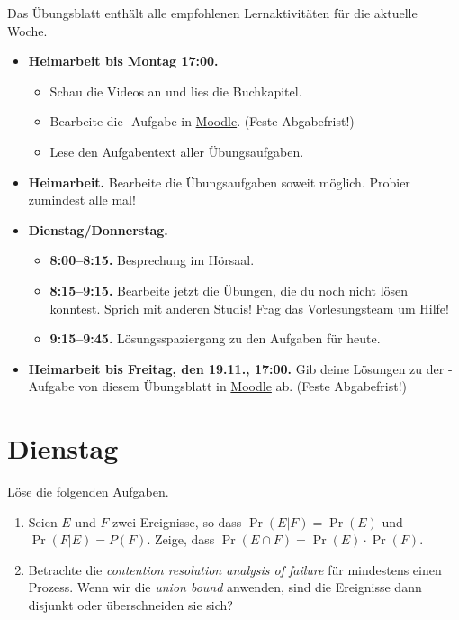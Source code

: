 \documentclass{uebung_cs}
\begin{document}
Das Übungsblatt enthält alle empfohlenen Lernaktivitäten für die aktuelle Woche.

\begin{itemize}
\item \textbf{Heimarbeit bis Montag 17:00.}
    \begin{itemize}
    \item 
    Schau die Videos an und lies die Buchkapitel.
    \item Bearbeite die -Aufgabe in \href{https://moodle.studiumdigitale.uni-frankfurt.de/moodle/course/view.php?id=2241}{Moodle}. (Feste Abgabefrist!)
    \item Lese den Aufgabentext aller Übungsaufgaben.
    \end{itemize}
\item \textbf{Heimarbeit.} Bearbeite die Übungsaufgaben soweit möglich. Probier zumindest alle mal!
\item \textbf{Dienstag/Donnerstag.}
\begin{itemize}
    \item \textbf{8:00--8:15.} Besprechung im Hörsaal.
    \item \textbf{8:15--9:15.} Bearbeite jetzt die Übungen, die du noch nicht lösen konntest. Sprich mit anderen Studis! Frag das Vorlesungsteam um Hilfe!
    \item \textbf{9:15--9:45.} Lösungsspaziergang zu den Aufgaben für heute.
\end{itemize}

\item \textbf{Heimarbeit bis Freitag, den 19.11., 17:00.} Gib deine Lösungen zu der -Aufgabe von diesem Übungsblatt in \href{https://moodle.studiumdigitale.uni-frankfurt.de/moodle/course/view.php?id=2241}{Moodle} ab. (Feste Abgabefrist!)
\end{itemize}

\section*{Dienstag}

\begin{aufgabe}[Wahrscheinlichkeitsrechnung]
	Löse die folgenden Aufgaben.
	\begin{enumerate}
		\item Seien $E$ und $F$ zwei Ereignisse, so dass $\Pr(E | F) = \Pr(E)$ und $\Pr(F | E) = P(F)$. Zeige, dass $\Pr(E \cap F) = \Pr(E) \cdot \Pr(F)$. \\
		\item Betrachte die \textit{contention resolution analysis of failure} für mindestens einen Prozess. Wenn wir die \textit{union bound} anwenden, sind die Ereignisse dann disjunkt oder überschneiden sie sich?
	\end{enumerate}		
\end{aufgabe}
\end{document}
